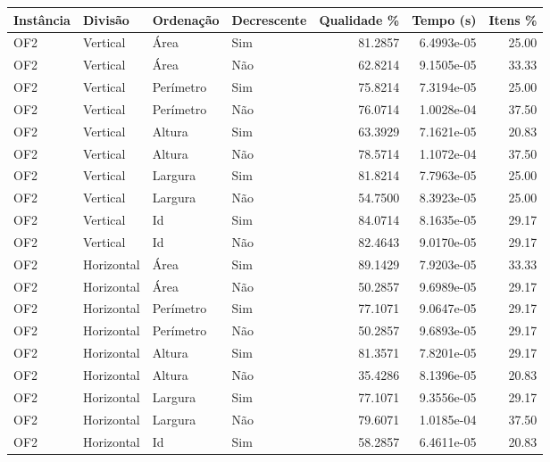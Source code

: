 \begin{tabular}{llllrrr}
\hline
Instância & Divisão     & Ordenação & Decrescente & Qualidade \% & Tempo (s)  & Itens \% \\
\hline
OF2       & Vertical    & Área      & Sim         & 81.2857      & 6.4993e-05 & 25.00    \\
OF2       & Vertical    & Área      & Não         & 62.8214      & 9.1505e-05 & 33.33    \\
OF2       & Vertical    & Perímetro & Sim         & 75.8214      & 7.3194e-05 & 25.00    \\
OF2       & Vertical    & Perímetro & Não         & 76.0714      & 1.0028e-04 & 37.50    \\
OF2       & Vertical    & Altura    & Sim         & 63.3929      & 7.1621e-05 & 20.83    \\
OF2       & Vertical    & Altura    & Não         & 78.5714      & 1.1072e-04 & 37.50    \\
OF2       & Vertical    & Largura   & Sim         & 81.8214      & 7.7963e-05 & 25.00    \\
OF2       & Vertical    & Largura   & Não         & 54.7500      & 8.3923e-05 & 25.00    \\
OF2       & Vertical    & Id        & Sim         & 84.0714      & 8.1635e-05 & 29.17    \\
OF2       & Vertical    & Id        & Não         & 82.4643      & 9.0170e-05 & 29.17    \\
OF2       & Horizontal  & Área      & Sim         & 89.1429      & 7.9203e-05 & 33.33    \\
OF2       & Horizontal  & Área      & Não         & 50.2857      & 9.6989e-05 & 29.17    \\
OF2       & Horizontal  & Perímetro & Sim         & 77.1071      & 9.0647e-05 & 29.17    \\
OF2       & Horizontal  & Perímetro & Não         & 50.2857      & 9.6893e-05 & 29.17    \\
OF2       & Horizontal  & Altura    & Sim         & 81.3571      & 7.8201e-05 & 29.17    \\
OF2       & Horizontal  & Altura    & Não         & 35.4286      & 8.1396e-05 & 20.83    \\
OF2       & Horizontal  & Largura   & Sim         & 77.1071      & 9.3556e-05 & 29.17    \\
OF2       & Horizontal  & Largura   & Não         & 79.6071      & 1.0185e-04 & 37.50    \\
OF2       & Horizontal  & Id        & Sim         & 58.2857      & 6.4611e-05 & 20.83    \\

\end{tabular}
